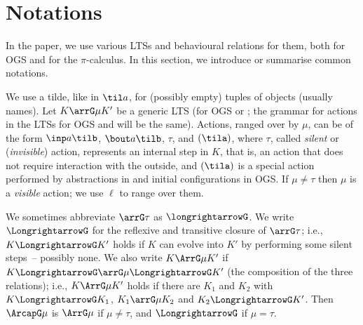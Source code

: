 

\section{Notations}
\label{s:nota}

In the paper, we use various LTSs and behavioural relations for them, 
both for OGS and for the $\pi$-calculus.  
In this section, we introduce or summarise common notations. 

We use a tilde, like in $\til a$, for  (possibly empty) tuples of objects (usually names). 
Let $ K \arrG \mu K'$ be a generic LTS (for OGS or \piI; the grammar for actions in the
LTSs  for OGS
and \piI will be the same). 
Actions, ranged over by $\mu$,  can be of the form $\inp a \tilb$, $\bout a \tilb$,
$\tau$,  and $(\tila)$, where $\tau$, called \emph{silent} or (\emph{invisible}) action, 
represents an internal step in $K$, that is, an action that does not require interaction
with the outside,  and $(\tila)$ is  a special action performed by abstractions in \piI
and initial configurations in OGS.   If $\mu \neq \tau$ then $\mu$ is a \emph{visible} action; we use
$\ell$ to range over them.

We sometimes abbreviate $\arrG\tau$ as $ \longrightarrowG $.
We  write $ \LongrightarrowG$ for the reflexive and transitive closure of 
$\arrG\tau$;
i.e., $K
\LongrightarrowG K'
 $ holds if $K $ can evolve into $K'$ by performing some
silent steps~-- possibly none.
We also write 
$K \ArrG \mu K' $ if   $K \LongrightarrowG \arrG\mu \LongrightarrowG K' $ (the
composition of the three 
relations); i.e.,  
$K \ArrG \mu K'$ holds if there are $K_1 $ and $K_2$ with 
$K \LongrightarrowG K_1$, $K_1 \arrG\mu K_2$ 
and $K_2 \LongrightarrowG K'$.
Then $ \ArcapG \mu  $  is  $\ArrG \mu $ if $\mu\neq \tau$, and  
$\LongrightarrowG $ if $\mu=\tau$. 

